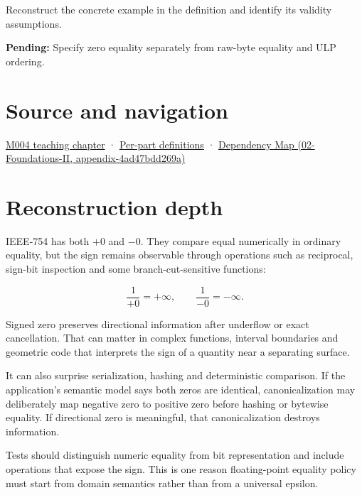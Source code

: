 Reconstruct the concrete example in the definition and identify its validity assumptions.

\textbf{Pending:} Specify zero equality separately from raw-byte equality and ULP ordering.

\section{Source and navigation}\label{appendix-3a048f032c1f-source-and-navigation}

\href{Continuous\%20Notes/Computing\%20Foundations\%20-\%20From\%20Bits\%20to\%20C++\%20and\%20Systems\%20APIs\#A\%20stretching\%20ruler\%20for\%20real-valued\%20quantities}{M004 teaching chapter} · \hyperref[appendix-fd090d982a15-m004---parts-61-76]{Per-part definitions} · \href{../02-Foundations-II/main.pdf\#nameddest=appendix-4ad47bdd269a}{Dependency Map (02-Foundations-II, appendix-4ad47bdd269a)}

\section{Reconstruction depth}\label{appendix-3a048f032c1f-reconstruction-depth}

IEEE-754 has both \(+0\) and \(-0\). They compare equal numerically in ordinary equality, but the sign remains observable through operations such as reciprocal, sign-bit inspection and some branch-cut-sensitive functions:

\[
\frac{1}{+0}=+\infty,
\qquad
\frac{1}{-0}=-\infty.
\]

Signed zero preserves directional information after underflow or exact cancellation. That can matter in complex functions, interval boundaries and geometric code that interprets the sign of a quantity near a separating surface.

It can also surprise serialization, hashing and deterministic comparison. If the application's semantic model says both zeros are identical, canonicalization may deliberately map negative zero to positive zero before hashing or bytewise equality. If directional zero is meaningful, that canonicalization destroys information.

Tests should distinguish numeric equality from bit representation and include operations that expose the sign. This is one reason floating-point equality policy must start from domain semantics rather than from a universal epsilon.
